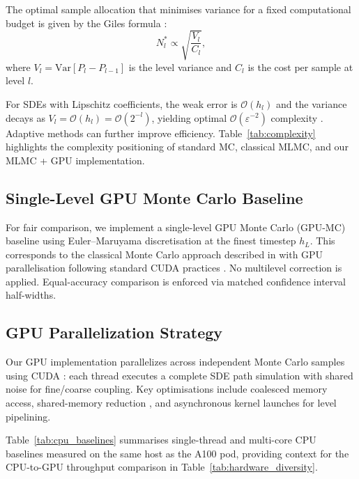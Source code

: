 \documentclass{ieeeaccess}
\begin{document}
The optimal sample allocation that minimises variance for a fixed computational budget is given
by the Giles formula \cite{giles2015multilevel}:
\begin{equation}
    N_l^* \propto \sqrt{\frac{V_l}{C_l}},
    \label{eq:giles}
\end{equation}
where $V_l = \mathrm{Var}[P_l - P_{l-1}]$ is the level variance and $C_l$ is the cost per sample
at level $l$.

For SDEs with Lipschitz coefficients, the weak error is $\mathcal{O}(h_l)$ and the variance
decays as $V_l = \mathcal{O}(h_l) = \mathcal{O}(2^{-l})$, yielding optimal
$\mathcal{O}(\varepsilon^{-2})$ complexity \cite{giles2015multilevel,higham2015}. Adaptive
methods \cite{collier2015} can further improve efficiency. Table~\ref{tab:complexity}
highlights the complexity positioning of standard MC, classical MLMC, and our MLMC + GPU
implementation.

\subsection{Single-Level GPU Monte Carlo Baseline}

For fair comparison, we implement a single-level GPU Monte Carlo (GPU-MC) baseline using
Euler--Maruyama discretisation at the finest timestep $h_L$. This corresponds to the classical
Monte Carlo approach described in \cite{glasserman2003monte} with GPU parallelisation following
standard CUDA practices \cite{nvidia2020cuda,owens2008,harris2007}. No multilevel correction is
applied. Equal-accuracy comparison is enforced via matched confidence interval half-widths.

\subsection{GPU Parallelization Strategy}

Our GPU implementation parallelizes across independent Monte Carlo samples using CUDA
\cite{nvidia2020cuda}: each thread executes a complete SDE path simulation with shared noise for
fine/coarse coupling. Key optimisations include coalesced memory access, shared-memory reduction
\cite{harris2007}, and asynchronous kernel launches for level pipelining.

Table~\ref{tab:cpu_baselines} summarises single-thread and multi-core CPU baselines measured on
the same host as the A100 pod, providing context for the CPU-to-GPU throughput comparison in
Table~\ref{tab:hardware_diversity}.
\end{document}
